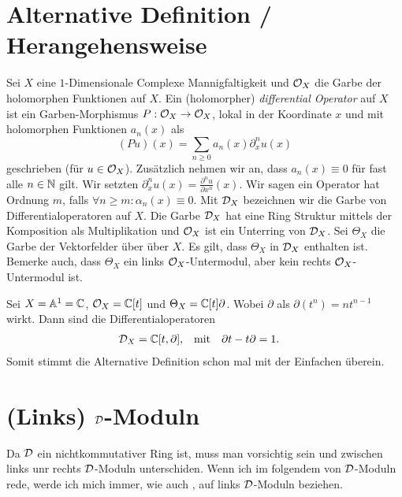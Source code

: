 \section{Alternative Definition / Herangehensweise}
\cite[Chap 1.1.]{kashiwara2003d}
Sei $X$ eine $1$-Dimensionale Complexe Mannigfaltigkeit und $\mathcal{O}_X$ die Garbe
der holomorphen Funktionen auf $X$. Ein (holomorpher) \emph{differential
Operator} auf $X$ ist ein Garben-Morphismus $P:\mathcal{O}_X\rightarrow \mathcal{O}_X$, lokal
in der Koordinate $x$ und mit holomorphen Funktionen $a_n(x)$ als
\[
(Pu)(x)=\sum_{n\geq0}a_n(x)\partial_x^nu(x)
\]
geschrieben (für $u\in\mathcal{O}_X$). Zusätzlich nehmen wir an, dass $a_n(x)\equiv 0$
für fast alle $n\in \mathbb{N}$ gilt. Wir setzten
$\partial_x^nu(x)=\frac{\partial^nu}{\partial x^n}(x)$. Wir sagen ein Operator
hat Ordnung $m$, falls $\forall n\geq m: \alpha_n(x)\equiv0$.  Mit $\mathcal{D}_X$
bezeichnen wir die Garbe von Differentialoperatoren auf $X$. Die Garbe $\mathcal{D}_X$
hat eine Ring Struktur mittels der Komposition als Multiplikation und $\mathcal{O}_X$
ist ein Unterring von $\mathcal{D}_X$. Sei $\Theta_X$ die Garbe der Vektorfelder über
über $X$. Es gilt, dass $\Theta_X$ in $\mathcal{D}_X$ enthalten ist. Bemerke auch, dass
$\Theta_X$ ein links $\mathcal{O}_X$-Untermodul, aber kein rechts $\mathcal{O}_X$-Untermodul ist.

\begin{prop}
\cite[Exmp 1.1]{ArkhipovDmod}
Sei $X=\mathbb{A}^1=\mathbb{C}$, $\mathcal{O}_X=\mathbb{C}[t]$ und $\Theta_X=\mathbb{C}[t]\partial$. Wobei $\partial$
als $\partial(t^n)=nt^{n-1}$ wirkt. Dann sind die Differentialoperatoren 
\begin{align*}
\mathcal{D}_X &= \mathbb{C}[t,\partial], & \mbox{mit} & & \partial t-t\partial & =1.
\end{align*}
Somit stimmt die Alternative Definition schon mal mit der Einfachen überein.
\end{prop}

\section{(Links) $\mathcal{D}$-Moduln}
Da $\mathcal{D}$ ein nichtkommutativer Ring ist, muss man vorsichtig sein und zwischen
links unr rechts $\mathcal{D}$-Moduln unterschiden. Wenn ich im folgendem von
$\mathcal{D}$-Moduln rede, werde ich mich immer, wie auch \cite[Chapter
1.6.]{arapuraNotes}, auf links $\mathcal{D}$-Moduln beziehen.

